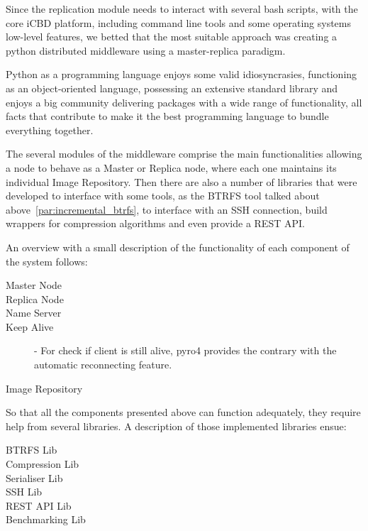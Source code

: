 Since the replication module needs to interact with several bash scripts, with the core iCBD platform, including command line tools and some operating systems low-level features, we betted that the most suitable approach was creating a python distributed middleware using a master-replica paradigm.

Python as a programming language enjoys some valid idiosyncrasies, functioning as an object-oriented language, possessing an extensive standard library and enjoys a big community delivering packages with a wide range of functionality, all facts that contribute to make it the best programming language to bundle everything together.

The several modules of the middleware comprise the main functionalities allowing a node to behave as a Master or Replica node, where each one maintains its individual Image Repository. Then there are also a number of libraries that were developed to interface with some tools, as the BTRFS tool talked about above~\ref{par:incremental_btrfs}, to interface with an SSH connection, build wrappers for compression algorithms and even provide a REST API.

An overview with a small description of the functionality of each component of the system follows:

\begin{description}
	\item [Master Node] 
	\item [Replica Node]
	\item [Name Server] 
	\item [Keep Alive] - For check if client is still alive, pyro4 provides the contrary with the automatic reconnecting feature.
	\item [Image Repository]
\end{description}


So that all the components presented above can function adequately, they require help from several libraries. A description of those implemented libraries ensue:

\begin{description}
	\item [BTRFS Lib]
	\item [Compression Lib]
	\item [Serialiser Lib]
	\item [SSH Lib]
	\item [REST API Lib]
	\item [Benchmarking Lib]
\end{description}



